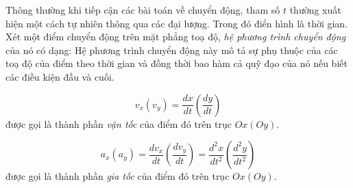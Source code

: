     Thông thường khi tiếp cận các bài toán về chuyển động, tham số $t$ thường xuất hiện một cách tự nhiên thông qua các đại lượng. Trong đó điển hình là thời gian.\newline
    Xét một điểm chuyển động trên mặt phẳng toạ độ, \emph{hệ phương trình chuyển động} của nó có dạng: \newline
    Hệ phương trình chuyển động này mô tả sự phụ thuộc của các toạ độ của điểm theo thời gian và đồng thời bao hàm cả quỹ đạo của nó nếu biết các điều kiện đầu và cuối.
    \begin{definition}
        \begin{equation}
            v_{x} (v_y)=\frac{dx}{dt}\left(\frac{dy}{dt}\right)
        \end{equation}
    được gọi là thành phần \emph{vận tốc} của điểm đó trên trục $Ox(Oy)$.
    \end{definition}
    \begin{definition}
        \begin{equation}
            a_{x}(a_y)=\frac{dv_x}{dt}\left(\frac{dv_y}{dt}\right)=\frac{d^2x}{dt^2}\left(\frac{d^2y}{dt^2}\right)
        \end{equation}
    được gọi là thành phần \emph{gia tốc} của điểm đó trên trục $Ox(Oy)$.
    \end{definition}
    
